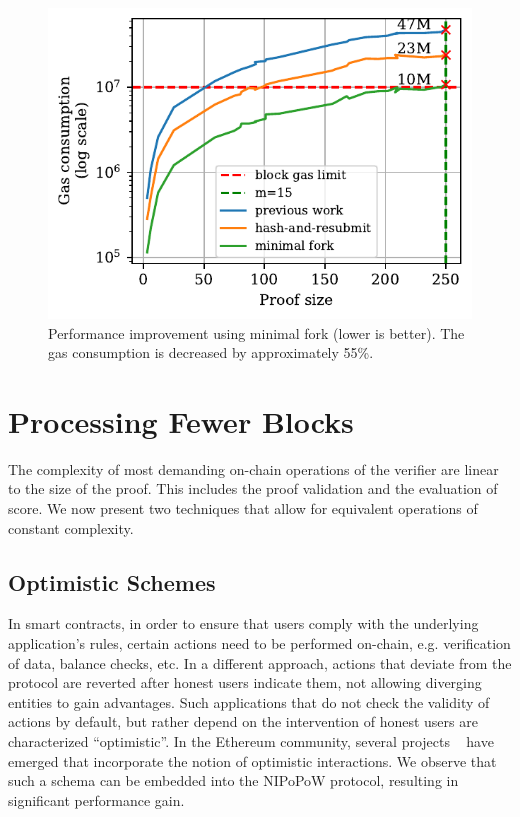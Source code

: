 \begin{figure}[H]
    \begin{center}
        \includegraphics[width=0.6\columnwidth]{figures/minimal-fork.pdf}
    \end{center}
    \caption{Performance improvement using minimal fork (lower is better). The
        gas consumption is decreased by approximately 55\%.}
    \label{fig:minimal-fork}
\end{figure}

\section{Processing Fewer Blocks}

The complexity of most demanding on-chain operations of the verifier are linear
to the size of the proof. This includes the proof validation and the evaluation
of score. We now present two techniques that allow for equivalent operations of
constant complexity.

\subsection{Optimistic Schemes} In smart contracts, in order to ensure that users
comply with the underlying application's rules, certain actions need to be
performed on-chain, e.g. verification of data, balance checks, etc. In a
different approach, actions that deviate from the protocol are reverted after
honest users indicate them, not allowing diverging entities to gain advantages.
Such applications that do not check the validity of actions by default, but
rather depend on the intervention of honest users are characterized
``optimistic''. In the Ethereum community, several projects ~\cite{piza,
plasma, rollups-1, rollups-2} have emerged that incorporate the notion of
optimistic interactions. We observe that such a schema can be embedded into the
NIPoPoW protocol, resulting in significant performance gain.

